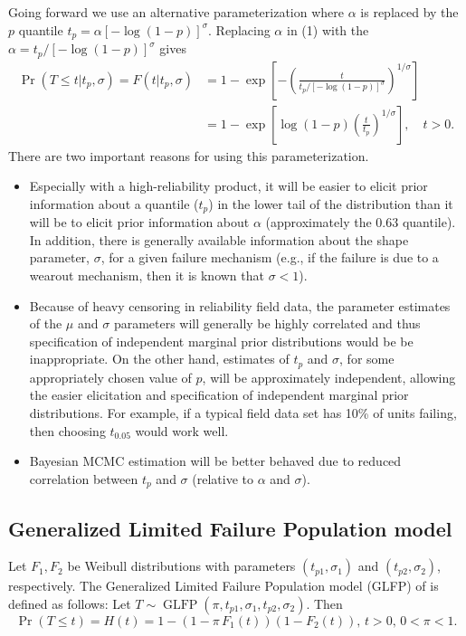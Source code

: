 \documentclass[12pt]{article}
\newcommand{\op}{\operatorname}
\begin{document}
Going forward we use an alternative parameterization
where $\alpha$ is replaced by the $p$ quantile $t_{p}=\alpha \left
[-\log(1-p)\right ]^{\sigma}$. Replacing $\alpha$ in (1) with the
$\alpha=t_{p}/[-\log(1-p)]^{\sigma}$ gives
\begin{align*}
\nonumber
\Pr(T \leq t|t_{p},\sigma ) = F(t|t_{p},\sigma)&=1-
\exp \left [-\left (\frac{t}{t_{p}/[-\log(1-p)]^{\sigma}} \right )^{1/ \sigma}
\right ]\\
\label{equation:reparameterized.weibull.cdf}
&=1 - \exp\left[\log(1-p)\left(\frac{t}{t_{p}}\right)^{1/\sigma}\right], \quad t > 0.
\end{align*}
There are two important reasons for using this parameterization.
\begin{itemize}
\item
Especially with a high-reliability product, it will be easier to
elicit prior information about a quantile  ($t_p$) in the lower tail of the
distribution than it will be to elicit prior information about
$\alpha$ (approximately the $0.63$ quantile). In addition, there is generally available
information about the shape parameter, $\sigma$, for a given failure
mechanism (e.g., if the failure is due to a wearout mechanism, then
it is known that $\sigma<1$). 
\item
Because of heavy censoring in reliability field data, the parameter
estimates of the $\mu$ and $\sigma$ parameters will generally be
highly correlated and thus specification of independent marginal
prior distributions would be be inappropriate. On the other hand,
estimates of $t_{p}$ and $\sigma$, for some appropriately chosen
value of $p$, will be approximately independent, allowing the easier
elicitation and specification of independent marginal prior
distributions. For example, if a typical field data set has 10\% of units
failing, then choosing $t_{0.05}$ would 
work well.
\item Bayesian MCMC estimation will be better behaved due to reduced correlation between $t_p$ and $\sigma$ (relative to $\alpha$ and $\sigma$).
\end{itemize}

\subsection{Generalized Limited Failure Population model}
\label{subsec:GLFP model}
Let $F_1,F_2$ be Weibull distributions with parameters $(t_{p1},\sigma_1)$ and $(t_{p2}, \sigma_2)$, respectively.
The Generalized Limited Failure Population model (GLFP) of \citet{chan} is defined as follows: Let $T \sim \op{GLFP}(\pi, t_{p1},\sigma_1,t_{p2},\sigma_2)$. Then
$$\Pr(T \le t) = H(t) = 1 - (1-\pi\, F_{1}(t))(1 - F_{2}(t)),\, t>0,\, 0 < \pi < 1.$$
\end{document}
